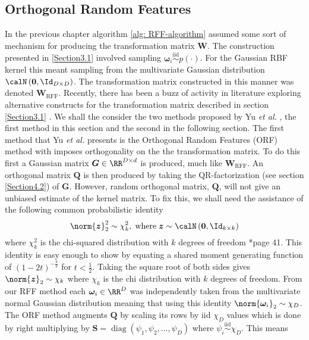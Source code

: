 \subsection{Orthogonal Random Features}\label{Section3.2}
In the previous chapter algorithm \ref{alg: RFF-algorithm} assumed some sort of mechanism for producing the transformation matrix $\bm{W}$. The construction presented in \ref{Section3.1} involved sampling $\bm{\omega}_{i} \stackrel{\text{iid}}{\sim} p(\cdot)$. For the Gaussian RBF kernel this meant sampling from the multivariate Gaussian distribution $\calN \left( \bm{0} , \Id_{D \times D} \right)$. The transformation matrix constructed in this manner was denoted $\bm{W}_{\text{RFF}}$. Recently, there has been a buzz of activity in literature exploring alternative constructs for the transformation matrix described in section \ref{Section3.1} \cite{LiuFanghui2021RFfK}. We shall the consider the two methods proposed by Yu {\it et al.} \cite{YuFelixX2016ORF}, the first method in this section and the second in the following section. The first method that Yu {\it et al.} presents is the Orthogonal Random Features (ORF) method with imposes orthogonality on the the transformation matrix. To do this first a Gaussian matrix $\bm{G} \in \RR^{D \times d}$ is produced, much like $\bm{W}_{\text{RFF}}$. An orthogonal matrix $\bm{Q}$ is then produced by taking the QR-factorization (see section \ref{Section4.2}) of $\bm{G}$. However, random orthogonal matrix, $\bm{Q}$, will not give an unbiased estimate of the kernel matrix. To fix this, we shall need the assistance of the following common probabilistic identity
\[
    \norm{\bm{z}}^2_2 \sim \chi^2_k, \; \text{where} \; \bm{z} \sim \calN \left( \bm{0}, \Id_{k \times k} \right)
\]
where $\chi^2_k$ is the chi-squared distribution with $k$ degrees of freedom \cite{BrockwellPeterJ1991TSTa}*{page 41}. This identity is easy enough to show by equating a shared moment generating function of $(1-2t)^{-\frac{k}{2}}$ for $t < \frac{1}{2}$. Taking the square root of both sides gives $\norm{\bm{z}}_2 \sim \chi_k$ where $\chi_k$ is the chi distribution with $k$ degrees of freedom. From our RFF method each $\bm{\omega}_i \in \RR^D$ was independently taken from the multivariate normal Gaussian distribution meaning that using this identity $\norm{\bm{\omega}_i}_2 \sim \chi_D$. The ORF method augments $\bm{Q}$ by scaling its rows by iid $\chi_D$ values which is done by right multiplying by $\bm{S} = \operatorname{diag} \left( \psi_1 , \psi_2 , \ldots , \psi_D \right)$ where $\psi_i \stackrel{\text{iid}}{\sim} \chi_D$. This means

